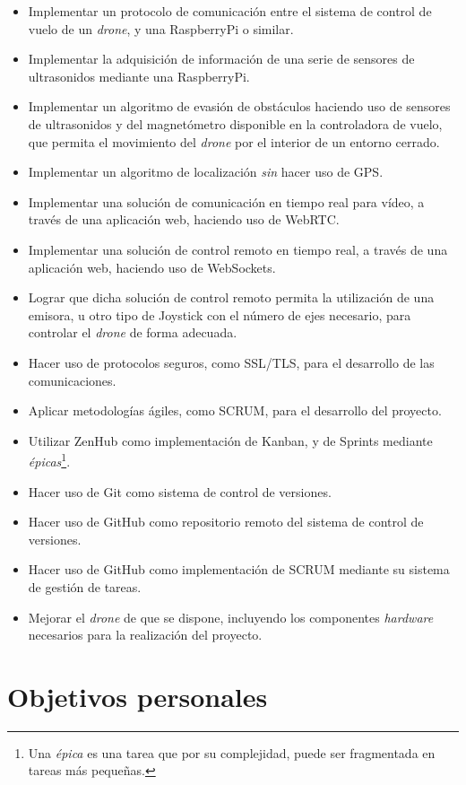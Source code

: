 \begin{itemize}
\item Implementar un protocolo de comunicación entre el sistema de control de vuelo de un \emph{drone}, y una RaspberryPi o similar.
\item Implementar la adquisición de información de una serie de sensores de ultrasonidos mediante una RaspberryPi.
\item Implementar un algoritmo de evasión de obstáculos haciendo uso de sensores de ultrasonidos y del magnetómetro disponible en la controladora de vuelo, que permita el movimiento del \emph{drone} por el interior de un entorno cerrado. 
\item Implementar un algoritmo de localización \emph{sin} hacer uso de GPS.
\item Implementar una solución de comunicación en tiempo real para vídeo, a través de una aplicación web, haciendo uso de WebRTC.
\item Implementar una solución de control remoto en tiempo real, a través de una aplicación web, haciendo uso de WebSockets.
\item Lograr que dicha solución de control remoto permita la utilización de una emisora, u otro tipo de Joystick con el número de ejes necesario, para controlar el \emph{drone} de forma adecuada.
\item Hacer uso de protocolos seguros, como SSL/TLS, para el desarrollo de las comunicaciones.  
\item Aplicar metodologías ágiles, como SCRUM, para el desarrollo del proyecto.
\item Utilizar ZenHub como implementación de Kanban, y de Sprints mediante \textit{épicas}\footnote{Una \emph{épica} es una tarea que por su complejidad, puede ser fragmentada en tareas más pequeñas.}.
\item Hacer uso de Git como sistema de control de versiones.
\item Hacer uso de GitHub como repositorio remoto del sistema de control de versiones.
\item Hacer uso de GitHub como implementación de SCRUM mediante su sistema de gestión de tareas.
\item Mejorar el \emph{drone} de que se dispone, incluyendo los componentes \emph{hardware} necesarios para la realización del proyecto.
\end{itemize}


\section{Objetivos personales}

